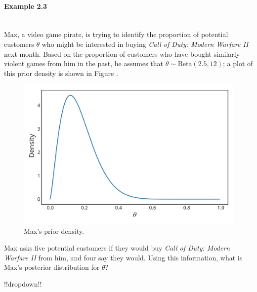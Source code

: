 \paragraph{Example 2.3}{~\\
Max, a video game pirate, is trying to identify the proportion of potential customers $\theta$ who might be interested in buying \textit{Call of Duty: Modern Warfare II} next month.  Based on the proportion of customers who have bought similarly violent games from him in the past, he assumes that $\theta \sim \mathrm{Beta}(2.5,12)$; a plot of this prior density is shown in Figure .  

\begin{figure}[h!]

\includegraphics{images/priorplot3.svg}
\caption{Max's prior density.}
\label{fig:maxprior}

\end{figure}
Max asks five potential customers if they would buy \textit{Call of Duty: Modern Warfare II} from him, and four say they would.  Using this information, what is Max's posterior distribution for $\theta$?   


!!dropdown!!

}
